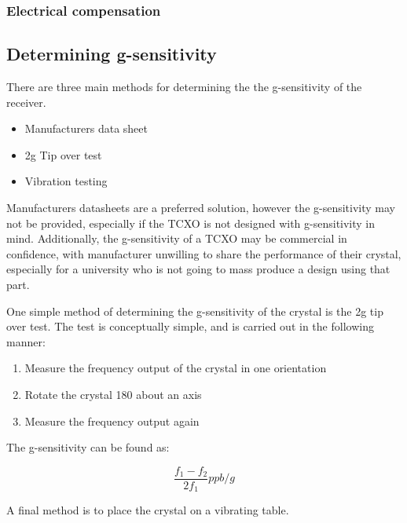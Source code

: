 \subsubsection{Electrical compensation}

\subsection{Determining g-sensitivity}
There are three main methods for determining the the g-sensitivity of the receiver.

\begin{itemize}
\item{Manufacturers data sheet}
\item{2g Tip over test}
\item{Vibration testing}
\end{itemize}

Manufacturers datasheets are a preferred solution, however the g-sensitivity may not be provided, especially if the \ac{TCXO} is not designed with g-sensitivity in mind. Additionally,  the g-sensitivity of a \ac{TCXO} may be commercial in confidence, with manufacturer unwilling to share the performance of their crystal, especially for a university who is not going to mass produce a design using that part. 

One simple method of determining the g-sensitivity of the crystal is the 2g tip over test. The test is conceptually simple, and is carried out in the following manner:

\begin{enumerate}
\item{Measure the frequency output of the crystal in one orientation}
\item{Rotate the crystal 180 \degree about an axis}
\item{Measure the frequency output again}
\end{enumerate}

 The g-sensitivity can be found as:

\begin{equation}
\frac{f_1-f_2}{2 f_1} ppb/g
\end{equation}

A final method is to place the crystal on a vibrating table. 

